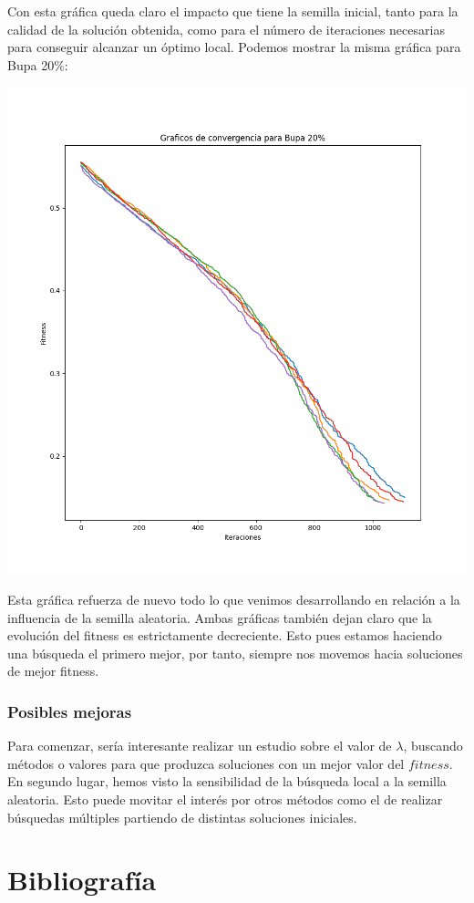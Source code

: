 \documentclass[11pt]{article}
\begin{document}
Con esta gráfica queda claro el impacto que tiene la semilla inicial, tanto para la calidad de la solución obtenida, como para el número de iteraciones necesarias para conseguir alcanzar un óptimo local. Podemos mostrar la misma gráfica para Bupa 20\%:

\includegraphics[scale=0.5]{convergencia_bupa_20}

Esta gráfica refuerza de nuevo todo lo que venimos desarrollando en relación a la influencia de la semilla aleatoria. Ambas gráficas también dejan claro que la evolución del fitness es estrictamente decreciente. Esto pues estamos haciendo una búsqueda el primero mejor, por tanto, siempre nos movemos hacia soluciones de mejor fitness.

\subsubsection{Posibles mejoras}

Para comenzar, sería interesante realizar un estudio sobre el valor de $\lambda$, buscando métodos o valores para que produzca soluciones con un mejor valor del $fitness$. En segundo lugar, hemos visto la sensibilidad de la búsqueda local a la semilla aleatoria. Esto puede movitar el interés por otros métodos como el de realizar búsquedas múltiples partiendo de distintas soluciones iniciales.

\pagebreak

\section{Bibliografía}



\end{document}
